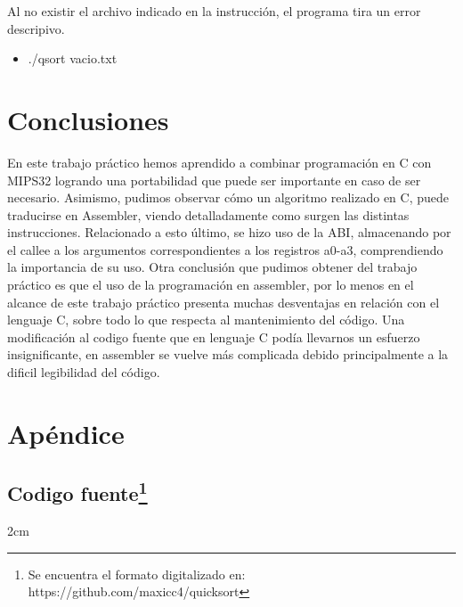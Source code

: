 \documentclass[a4paper,10pt]{article}
\numberwithin{equation}{section}
\numberwithin{figure}{section}
\begin{document}
Al no existir el archivo indicado en la instrucción, el programa tira un error descripivo.

\begin{itemize}
\item  ./qsort vacio.txt 
\end{itemize}
\noindent{}


\section{Conclusiones}

En este trabajo práctico hemos aprendido a combinar programación en C con MIPS32 logrando una portabilidad que puede ser importante en caso de ser necesario. Asimismo, pudimos observar cómo un algoritmo realizado en C, puede traducirse en Assembler, viendo detalladamente como surgen las distintas instrucciones. Relacionado a esto último, se hizo uso de la ABI, almacenando por el callee a los argumentos correspondientes a los registros a0-a3, comprendiendo la importancia de su uso.
Otra conclusión que pudimos obtener del trabajo práctico es que el uso de la programación en assembler, por lo menos en el alcance de este trabajo práctico presenta muchas desventajas en relación con el lenguaje C, sobre todo lo que respecta al mantenimiento del código. Una modificación
al codigo fuente que en lenguaje C podía llevarnos un esfuerzo insignificante, en assembler se vuelve más complicada debido principalmente a la dificil legibilidad del código.



\section{Apéndice}
\subsection{Codigo fuente\footnote{Se encuentra el formato digitalizado en: https://github.com/maxicc4/quicksort}}
\setmargins{2cm}{1.5cm}{13.5cm}{23.42cm}{10pt}{1cm}{0pt}
{2cm}
\end{document}
